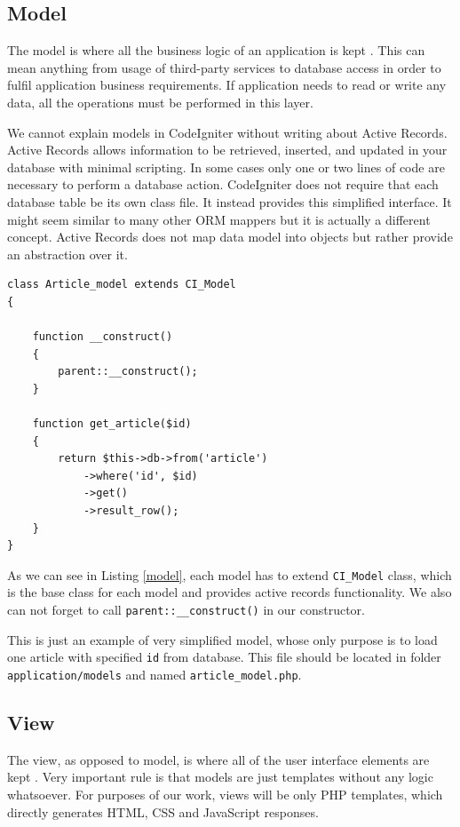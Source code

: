 \subsection{Model}
The model is where all the business logic of an application is kept \cite{phpmvc}. This can mean anything from usage of third-party services to database access in order to fulfil application business requirements. If application needs to read or write any data, all the operations must be performed in this layer.

We cannot explain models in CodeIgniter without writing about Active Records. Active Records allows information to be retrieved, inserted, and updated in your database with minimal scripting. In some cases only one or two lines of code are necessary to perform a database action. CodeIgniter does not require that each database table be its own class file. It instead provides this simplified interface\cite{codeigniter}. It might seem similar to many other ORM mappers but it is actually a different concept. Active Records does not map data model into objects but rather provide an abstraction over it.

\begin{lstlisting}[label={model}, caption={Article model}]
class Article_model extends CI_Model
{

    function __construct()
    {
        parent::__construct();
    }

    function get_article($id)
    {
        return $this->db->from('article')
            ->where('id', $id)
            ->get()
            ->result_row();
    }
}
\end{lstlisting}

As we can see in Listing \ref{model}, each model has to extend \texttt{CI\_Model} class, which is the base class for each model and provides active records functionality. We also can not forget to call \texttt{parent::\_\_construct()} in our constructor.

This is just an example of very simplified model, whose only purpose is to load one article with specified \texttt{id} from database. This file should be located in folder \texttt{application/models} and named \texttt{article\_model.php}.

\subsection{View}
The view, as opposed to model, is where all of the user interface elements are kept \cite{phpmvc}. Very important rule is that models are just templates without any logic whatsoever. For purposes of our work, views will be only PHP templates, which directly generates HTML, CSS and JavaScript responses.

